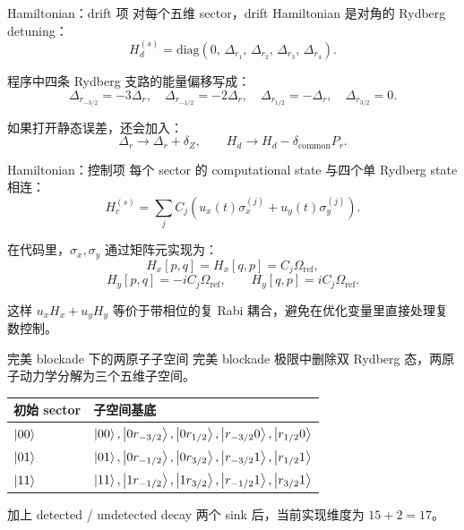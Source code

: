 \documentclass[aspectratio=169,11pt]{ctexbeamer}
\newcommand{\Deltar}{\Delta_r}
\begin{document}
\begin{frame}{Hamiltonian：drift 项}
  对每个五维 sector，drift Hamiltonian 是对角的 Rydberg detuning：
  \[
    H_d^{(s)}
    =
    \mathrm{diag}
    \left(
      0,\,
      \Delta_{r_1},\,
      \Delta_{r_2},\,
      \Delta_{r_3},\,
      \Delta_{r_4}
    \right).
  \]

  程序中四条 Rydberg 支路的能量偏移写成：
  \[
    \Delta_{r_{-3/2}}=-3\Deltar,\quad
    \Delta_{r_{-1/2}}=-2\Deltar,\quad
    \Delta_{r_{1/2}}=-\Deltar,\quad
    \Delta_{r_{3/2}}=0.
  \]

  如果打开静态误差，还会加入：
  \[
    \Deltar\rightarrow \Deltar+\delta_Z,\qquad
    H_d\rightarrow H_d-\delta_{\mathrm{common}}P_r.
  \]
\end{frame}

\begin{frame}{Hamiltonian：控制项}
  每个 sector 的 computational state 与四个单 Rydberg state 相连：
  \[
    H_c^{(s)}
    =
    \sum_j
    C_j
    \left(
      u_x(t)\sigma_x^{(j)}
      +
      u_y(t)\sigma_y^{(j)}
    \right).
  \]

  在代码里，\(\sigma_x,\sigma_y\) 通过矩阵元实现为：
  \[
    H_x[p,q]=H_x[q,p]=C_j\Omega_{\mathrm{ref}},
  \]
  \[
    H_y[p,q]=-iC_j\Omega_{\mathrm{ref}},
    \qquad
    H_y[q,p]=iC_j\Omega_{\mathrm{ref}}.
  \]

  这样 \(u_xH_x+u_yH_y\) 等价于带相位的复 Rabi 耦合，避免在优化变量里直接处理复数控制。
\end{frame}

\begin{frame}{完美 blockade 下的两原子子空间}
  完美 blockade 极限中删除双 Rydberg 态，两原子动力学分解为三个五维子空间。

  \begin{table}
    \centering
    \small
    \begin{tabular}{ll}
      \toprule
      初始 sector & 子空间基底 \\
      \midrule
      \(\ket{00}\) &
      \(\ket{00},\ket{0r_{-3/2}},\ket{0r_{1/2}},\ket{r_{-3/2}0},\ket{r_{1/2}0}\) \\
      \(\ket{01}\) &
      \(\ket{01},\ket{0r_{-1/2}},\ket{0r_{3/2}},\ket{r_{-3/2}1},\ket{r_{1/2}1}\) \\
      \(\ket{11}\) &
      \(\ket{11},\ket{1r_{-1/2}},\ket{1r_{3/2}},\ket{r_{-1/2}1},\ket{r_{3/2}1}\) \\
      \bottomrule
    \end{tabular}
  \end{table}

  加上 detected / undetected decay 两个 sink 后，当前实现维度为 \(15+2=17\)。
\end{frame}
\end{document}
